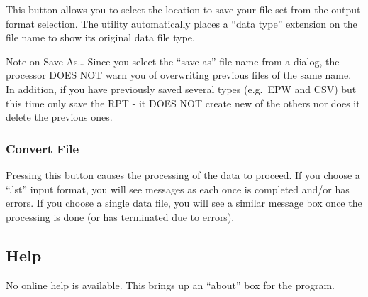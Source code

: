 This button allows you to select the location to save your file set from the output format selection. The utility automatically places a ``data type'' extension on the file name to show its original data file type.

Note on Save As\ldots{} Since you select the ``save as'' file name from a dialog, the processor DOES NOT warn you of overwriting previous files of the same name. In addition, if you have previously saved several types (e.g.~EPW and CSV) but this time only save the RPT - it DOES NOT create new of the others nor does it delete the previous ones.

\subsubsection{Convert File}\label{convert-file}

Pressing this button causes the processing of the data to proceed. If you choose a ``.lst'' input format, you will see messages as each once is completed and/or has errors. If you choose a single data file, you will see a similar message box once the processing is done (or has terminated due to errors).

\subsection{Help}\label{help}

No online help is available. This brings up an ``about'' box for the program.
